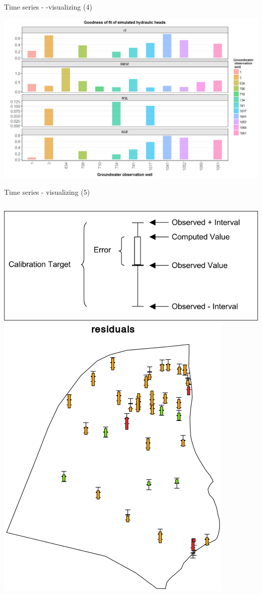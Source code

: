 \documentclass[8pt,ignorenonframetext,]{beamer}
\newcommand{\columnsbegin}{\begin{columns}}
\newcommand{\columnsend}{\end{columns}}
\begin{document}
\begin{frame}{Time series - -visualizing (4)}

\includegraphics{imgPres/time_series_head_analysis04.png}

\end{frame}

\begin{frame}{Time series - visualizing (5)}

\columnsbegin
{} \includegraphics{imgPres/ts_residuals.png}
\includegraphics{imgPres/ts_resdiuals_examples.png} \columnsend

\end{frame}
\end{document}
